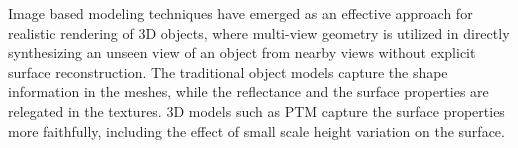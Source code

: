 




Image based modeling techniques \cite{C8,C6,C7} have emerged as
an effective approach for realistic rendering of 3D objects,
where multi-view geometry is utilized in directly synthesizing 
an unseen view of an object from nearby views without
explicit surface reconstruction. The traditional object models capture the shape information in the meshes,
while the reflectance and the surface properties are relegated in the textures. 3D models such as PTM capture the 
surface properties more faithfully, including the effect of small scale height variation on the surface.

